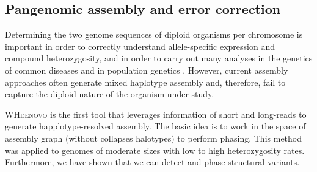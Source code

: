 %

\subsection{Pangenomic assembly and error correction}


Determining the two genome sequences of diploid organisms per chromosome is important in order to correctly understand allele-specific expression and compound heterozygosity, and in order to carry out many analyses in the genetics of common diseases and in population genetics \cite{tewhey2011importance}. 
However, current assembly approaches often generate mixed haplotype assembly and, therefore, fail to capture the diploid nature of the organism under study. 

\textsc{WHdenovo} \cite{garg2019trio, garg2018graph} is the first tool that leverages information of short and long-reads to generate happlotype-resolved assembly. 
The basic idea is to work in the space of assembly graph (without collapses halotypes) to perform phasing. 
This method was applied to genomes of moderate sizes with low to high heterozygosity rates. 
Furthermore, we have shown that we can detect and phase structural variants.

